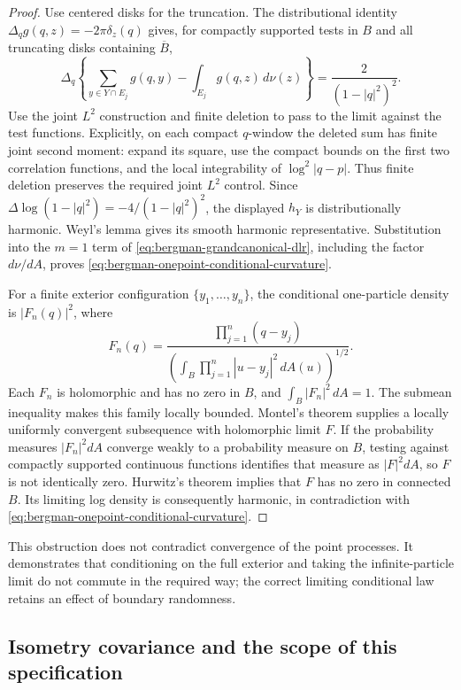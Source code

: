 \documentclass[11pt,a4paper]{article}
\numberwithin{equation}{section}
\theoremstyle{definition}
\theoremstyle{remark}
\begin{document}
\begin{proof}
Use centered disks for the truncation.  The distributional identity
$\Delta_qg(q,z)=-2\pi\delta_z(q)$ gives, for compactly supported tests
in $B$ and all truncating disks containing $\overline B$,
\[
 \Delta_q\left\{\sum_{y\in Y\cap E_j}g(q,y)
                   -\int_{E_j}g(q,z)\,d\nu(z)\right\}
 =\frac2{(1-|q|^2)^2}.
\]
Use the joint $L^2$ construction and finite deletion to pass to the
limit against the test functions.  Explicitly, on each compact
$q$-window the deleted sum has finite joint second moment: expand its
square, use the compact bounds on the first two correlation functions,
and the local integrability of $\log^2|q-p|$.  Thus finite deletion
preserves the required joint $L^2$ control.  Since
$\Delta\log(1-|q|^2)=-4/(1-|q|^2)^2$, the displayed $h_Y$ is
distributionally harmonic.  Weyl's lemma gives its smooth harmonic
representative.  Substitution into the $m=1$ term of
\eqref{eq:bergman-grandcanonical-dlr}, including the factor
$d\nu/dA$, proves \eqref{eq:bergman-onepoint-conditional-curvature}.

For a finite exterior configuration $\{y_1,\ldots,y_n\}$, the
conditional one-particle density is $|F_n(q)|^2$, where
\[
 F_n(q)=\frac{\prod_{j=1}^{n}(q-y_j)}
 {\left(\int_B\prod_{j=1}^{n}|u-y_j|^2\,dA(u)\right)^{1/2}}.
\]
Each $F_n$ is holomorphic and has no zero in $B$, and
$\int_B|F_n|^2\,dA=1$.  The submean inequality makes this family
locally bounded.  Montel's theorem supplies a locally uniformly
convergent subsequence with holomorphic limit $F$.  If the probability
measures $|F_n|^2dA$ converge weakly to a probability measure on $B$,
testing against compactly supported continuous functions identifies
that measure as $|F|^2dA$, so $F$ is not identically zero.  Hurwitz's
theorem implies that $F$ has no zero in connected $B$.  Its limiting
log density is consequently harmonic, in contradiction with
\eqref{eq:bergman-onepoint-conditional-curvature}.
\end{proof}

This obstruction does not contradict convergence of the point
processes.  It demonstrates that conditioning on the full exterior
and taking the infinite-particle limit do not commute in the required
way; the correct limiting conditional law retains an effect of
boundary randomness.

\subsection{Isometry covariance and the scope of this specification}
\end{document}
